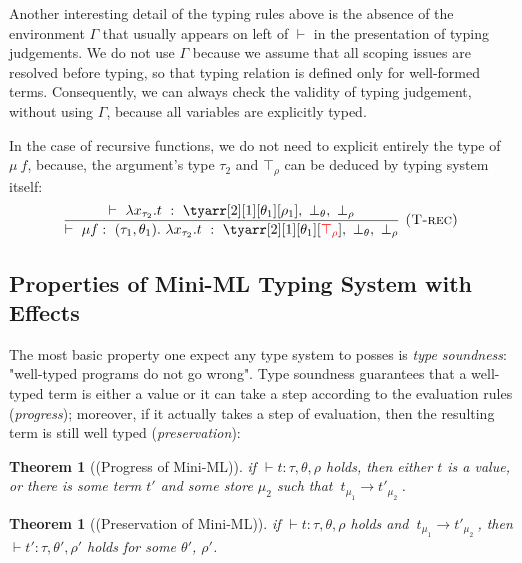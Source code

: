 \documentclass[a4paper,11pt,oneside]{article}
\theoremstyle{plain}
\newtheorem{theorem}[definition]{Theorem}
\newcommand{\bvee}{\boldsymbol{~\vee~}}
\newcommand{\typing}[4]{\vdash~#1~:~#2,~#3,~#4}
\newcommand{\bth}{\bot_\theta}
\newcommand{\brh}{\bot_\rho}
\newcommand{\trh}{\top_\rho}
\newcommand{\evalstep}[4]{~#1_{\mu_#2} \rightarrow #3_{\mu_#4} ~}
\begin{document}
	

	
	Another interesting detail of the typing rules above is the absence of the environment $\Gamma$ that usually appears on left of $\vdash$ in the presentation of typing judgements. 
	We do not use $\Gamma$ because we assume that all scoping issues are resolved before typing, so that typing relation is defined only for well-formed terms. 
	 Consequently, we can always check the validity of typing judgement, without using $\Gamma$, because all variables are explicitly typed.
	 
	 In the case of recursive functions, we do not need to explicit entirely the type of $\mu~f$, because, the argument's type $\tau_2$ and $\top_{\rho}$ can be deduced by typing system itself:
$$\dfrac 
	{\typing{\lambda x_{\tau_2}. t}{\tyarr[2][1][\theta_1][\rho_1]}{\bth}{\brh}}
	{\typing{\mu f:~(\tau_1, \theta_1) .~
		\lambda x_{\tau_2}. t}
		{\tyarr[2][1][\theta_1][\textcolor{red}{\trh}]}
			{\bth}{\brh}}
	{\textsc{  (T-rec)}}$$


		
\subsection{Properties of Mini-ML Typing System with Effects}	

	The most basic property	one expect any type system to posses is \textit{type soundness}: "well-typed programs do not go wrong". 
	Type soundness guarantees that a well-typed term is either a value or it can take a step according to the evaluation rules (\textit{progress}); moreover, if it actually takes a step of evaluation, then the resulting term is still well typed (\textit{preservation}):

\begin{theorem}[(Progress of Mini-ML)] 
if $\vdash t : \tau, \theta, \rho$ holds, then either $t$ is a value, or
there is some term $t'$ and some store $\mu_2$ such that 
$\evalstep{t}{1}{t'}{2}$.
\end{theorem}

\begin{theorem}[(Preservation of Mini-ML)] 
if $\vdash t : \tau, \theta, \rho$ holds and $\evalstep{t}{1}{t'}{2}$, then 
$\vdash t' : \tau, \theta', \rho'$ holds for some $\theta'$, $\rho'$.
\end{theorem}
	
\end{document}
